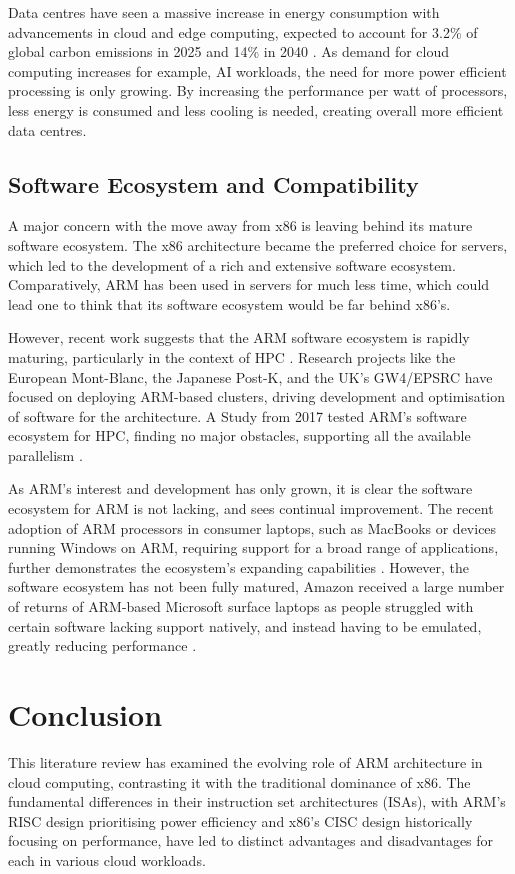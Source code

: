 \documentclass[conference]{IEEEtran}  %
\begin{document}
Data centres have seen a massive increase in energy consumption with advancements in cloud and edge computing, expected to account for 3.2\% of global carbon emissions in 2025 and 14\% in 2040 \cite{datacentreEnergy}. 
As demand for cloud computing increases for example, AI workloads, the need for more power efficient processing is only growing.
By increasing the performance per watt of processors, less energy is consumed and less cooling is needed, creating overall more efficient data centres.

\subsection{Software Ecosystem and Compatibility}
A major concern with the move away from x86 is leaving behind its mature software ecosystem.
The x86 architecture became the preferred choice for servers, which led to the development of a rich and extensive software ecosystem. 
Comparatively, ARM has been used in servers for much less time, which could lead one to think that its software ecosystem would be far behind x86's.

However, recent work suggests that the ARM software ecosystem is rapidly maturing, particularly in the context of HPC \cite{armEco}.
Research projects like the European Mont-Blanc, the Japanese Post-K, and the UK's GW4/EPSRC have focused on deploying ARM-based clusters, driving development and optimisation of software for the architecture. 
A Study from 2017 tested ARM's software ecosystem for HPC, finding no major obstacles, supporting all the available parallelism \cite{armEco}.

As ARM's interest and development has only grown, it is clear the software ecosystem for ARM is not lacking, and sees continual improvement. The recent adoption of ARM processors in consumer laptops, such as MacBooks or devices running Windows on ARM, requiring support for a broad range of applications, further demonstrates the ecosystem's expanding capabilities \cite{armLaptop}.
However, the software ecosystem has not been fully matured, Amazon received a large number of returns of ARM-based Microsoft surface laptops as people struggled with certain software lacking support natively, and instead having to be emulated, greatly reducing performance \cite{windowsOnArmWoes}.



\section{Conclusion} %
This literature review has examined the evolving role of ARM architecture in cloud computing, contrasting it with the traditional dominance of x86. The fundamental differences in their instruction set architectures (ISAs), with ARM's RISC design prioritising power efficiency and x86's CISC design historically focusing on performance, have led to distinct advantages and disadvantages for each in various cloud workloads.\cite{ARM_RISC_vs_x86_SISC} \cite{instructions_CISC_vs_RISC}
\end{document}
